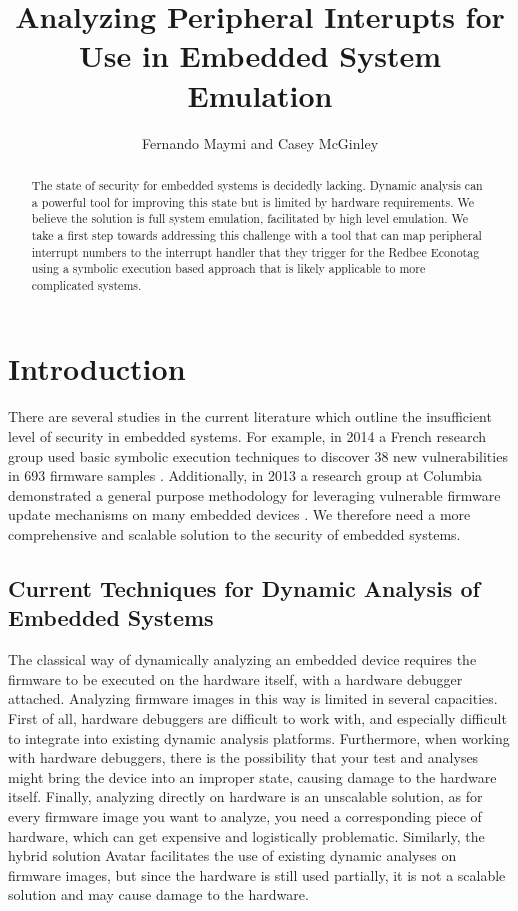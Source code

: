 \documentclass[letterpaper, 10 pt, conference]{ieeeconf}
\title{\LARGE \bf
Analyzing Peripheral Interupts for Use in Embedded System Emulation
}
\author{Fernando Maymi and Casey McGinley}
\begin{document}
\maketitle
\thispagestyle{empty}
\pagestyle{empty}

\begin{abstract}%
The state of security for embedded systems is decidedly lacking. Dynamic analysis can a powerful tool for improving this state but is limited by hardware requirements. We believe the solution is full system emulation, facilitated by high level emulation. We take a first step towards addressing this challenge with a tool that can map peripheral interrupt numbers to the interrupt handler that they trigger for the Redbee Econotag using a symbolic execution based approach that is likely applicable to more complicated systems.
\end{abstract}

\section{Introduction}\label{intr}
There are several studies in the current literature which outline the insufficient level of security in embedded systems. For example, in 2014 a French research group used basic symbolic execution techniques to discover 38 new vulnerabilities in 693 firmware samples \cite{acostin}. Additionally, in 2013 a research group at Columbia demonstrated a general purpose methodology for leveraging vulnerable firmware update mechanisms on many embedded devices \cite{acui}. We therefore need a more comprehensive and scalable solution to the security of embedded systems.

\subsection{Current Techniques for Dynamic Analysis of Embedded Systems} \label{crnt}
The classical way of dynamically analyzing an embedded device requires the firmware to be executed on the hardware itself, with a hardware debugger attached. Analyzing firmware images in this way is limited in several capacities. First of all, hardware debuggers are difficult to work with, and especially difficult to integrate into existing dynamic analysis platforms. Furthermore, when working with hardware debuggers, there is the possibility that your test and analyses might bring the device into an improper state, causing damage to the hardware itself. Finally, analyzing directly on hardware is an unscalable solution, as for every firmware image you want to analyze, you need a corresponding piece of hardware, which can get expensive and logistically problematic. Similarly, the hybrid solution Avatar \cite{avatar} facilitates the use of existing dynamic analyses on firmware images, but since the hardware is still used partially, it is not a scalable solution and may cause damage to the hardware.
\end{document}
